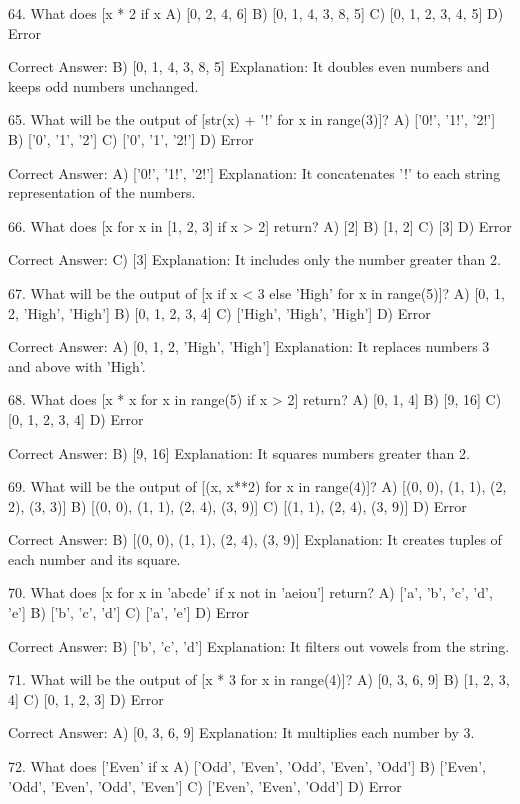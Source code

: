 64. What does [x * 2 if x %
A) [0, 2, 4, 6]
B) [0, 1, 4, 3, 8, 5]
C) [0, 1, 2, 3, 4, 5]
D) Error

Correct Answer: B) [0, 1, 4, 3, 8, 5]
Explanation: It doubles even numbers and keeps odd numbers unchanged.

65. What will be the output of [str(x) + '!' for x in range(3)]?
A) ['0!', '1!', '2!']
B) ['0', '1', '2']
C) ['0', '1', '2!']
D) Error

Correct Answer: A) ['0!', '1!', '2!']
Explanation: It concatenates '!' to each string representation of the numbers.

66. What does [x for x in [1, 2, 3] if x > 2] return?
A) [2]
B) [1, 2]
C) [3]
D) Error

Correct Answer: C) [3]
Explanation: It includes only the number greater than 2.

67. What will be the output of [x if x < 3 else 'High' for x in range(5)]?
A) [0, 1, 2, 'High', 'High']
B) [0, 1, 2, 3, 4]
C) ['High', 'High', 'High']
D) Error

Correct Answer: A) [0, 1, 2, 'High', 'High']
Explanation: It replaces numbers 3 and above with 'High'.

68. What does [x * x for x in range(5) if x > 2] return?
A) [0, 1, 4]
B) [9, 16]
C) [0, 1, 2, 3, 4]
D) Error

Correct Answer: B) [9, 16]
Explanation: It squares numbers greater than 2.

69. What will be the output of [(x, x**2) for x in range(4)]?
A) [(0, 0), (1, 1), (2, 2), (3, 3)]
B) [(0, 0), (1, 1), (2, 4), (3, 9)]
C) [(1, 1), (2, 4), (3, 9)]
D) Error

Correct Answer: B) [(0, 0), (1, 1), (2, 4), (3, 9)]
Explanation: It creates tuples of each number and its square.

70. What does [x for x in 'abcde' if x not in 'aeiou'] return?
A) ['a', 'b', 'c', 'd', 'e']
B) ['b', 'c', 'd']
C) ['a', 'e']
D) Error

Correct Answer: B) ['b', 'c', 'd']
Explanation: It filters out vowels from the string.

71. What will be the output of [x * 3 for x in range(4)]?
A) [0, 3, 6, 9]
B) [1, 2, 3, 4]
C) [0, 1, 2, 3]
D) Error

Correct Answer: A) [0, 3, 6, 9]
Explanation: It multiplies each number by 3.

72. What does ['Even' if x %
A) ['Odd', 'Even', 'Odd', 'Even', 'Odd']
B) ['Even', 'Odd', 'Even', 'Odd', 'Even']
C) ['Even', 'Even', 'Odd']
D) Error

